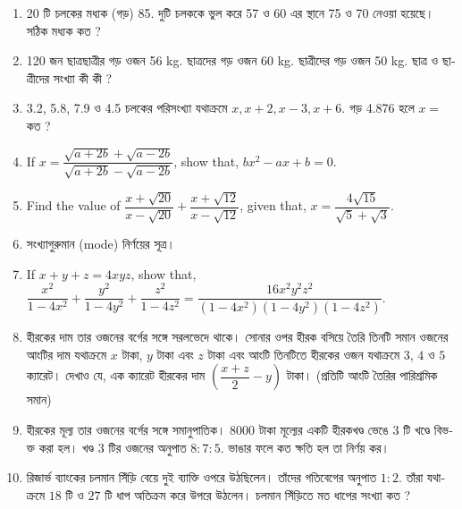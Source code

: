 \documentclass[11pt, a4paper]{article}
\begin{document}
\begin{enumerate}
	\item 20 \textbengali{টি চলকের মধ্যক (গড়)} 85. \textbengali{দুটি চলককে ভুল করে} 57 \textbengali{ও} 60 \textbengali{এর স্থানে} 75 \textbengali{ও} 70  \textbengali{নেওয়া হয়েছে। সঠিক মধ্যক কত ?}
	
	\item 120 \textbengali{জন ছাত্রছাত্রীর গড় ওজন} 56 kg. \textbengali{ছাত্রদের গড় ওজন} 60 kg. \textbengali{ছাত্রীদের গড় ওজন} 50 kg. \textbengali{ছাত্র ও ছাত্রীদের সংখ্যা কী কী ?}
	
	\item 3.2, 5.8, 7.9 \textbengali{ও} 4.5 \textbengali{চলকের পরিসংখ্যা যথাক্রমে} $x, x+2, x-3, x+6.$ \textbengali{গড়} 4.876 \textbengali{হলে} $x=$ \textbengali{কত ?}
	
	\item If $x = \dfrac{\sqrt{a+2b} + \sqrt{a-2b}}{\sqrt{a+2b} - \sqrt{a-2b}}$, show that, $bx^2 -ax+b = 0.$
	
	\item Find the value of $\dfrac{x+\sqrt{20}}{x-\sqrt{20}} + \dfrac{x+\sqrt{12}}{x-\sqrt{12}}$, given that, $x = \dfrac{4\sqrt{15}}{\sqrt{5} + \sqrt{3}}.$
	
	\item \textbengali{সংখ্যাগুরুমান} (mode) \textbengali{নির্ণয়ের সূত্র।}
	
	\item If $x + y + z = 4xyz$, show that, $\dfrac{x^2}{1 - 4x^2} + \dfrac{y^2}{1 - 4y^2} + \dfrac{z^2}{1 - 4z^2} = \dfrac{16x^2 y^2 z^2}{(1 - 4x^2) (1 - 4y^2) (1 - 4z^2)}.$

	\item \textbengali{হীরকের দাম তার ওজনের বর্গের সঙ্গে সরলভেদে থাকে। সোনার ওপর হীরক বসিয়ে তৈরি তিনটি সমান ওজনের আংটির দাম যথাক্রমে} $x$ \textbengali{টাকা},  $y$ \textbengali{টাকা এবং} $z$ \textbengali{টাকা এবং আংটি তিনটিতে হীরকের ওজন যথাক্রমে} $3$, $4$ \textbengali{ও} $5$ \textbengali{ক্যারেট। দেখাও যে, এক ক্যারেট হীরকের দাম} $\left( \dfrac{x+z}{2} - y \right)$ \textbengali{টাকা।  (প্রতিটি আংটি তৈরির পারিশ্রমিক সমান)}

	\item \textbengali{হীরকের মূল্য তার ওজনের বর্গের সঙ্গে সমানুপাতিক।} $8000$ \textbengali{টাকা মূল্যের একটি হীরকখণ্ড ভেঙে} $3$ \textbengali{টি খণ্ডে বিভক্ত করা হল। খণ্ড} $3$ \textbengali{টির ওজনের অনুপাত} $8:7:5$. \textbengali{ভাঙার ফলে কত ক্ষতি হল তা নির্ণয় কর।}
	
	\item \textbengali{রিজার্ভ ব্যাংকের চলমান সিঁড়ি বেয়ে দুই ব্যাক্তি ওপরে উঠছিলেন। তাঁদের গতিবেগের অনুপাত} $1:2$. \textbengali{তাঁরা যথাক্রমে} $18$ \textbengali{টি ও } $27$ \textbengali{টি ধাপ অতিক্রম করে উপরে উঠলেন। চলমান সিঁড়িতে মত ধাপের সংখ্যা কত ?}


\end{enumerate}
\end{document}
